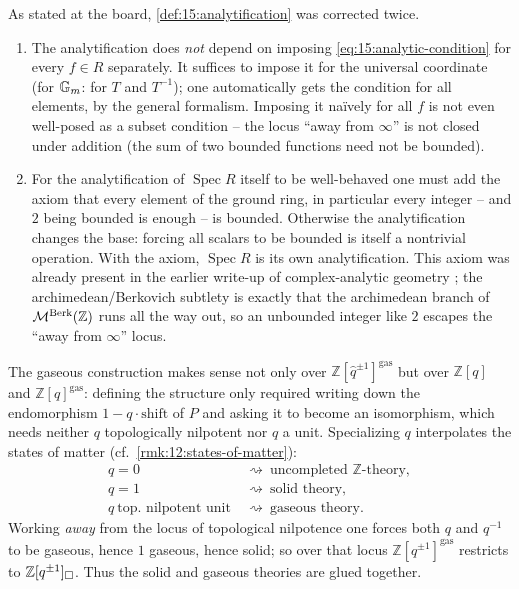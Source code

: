 \begin{remark}
\label{rmk:15:analytic-corrections}
As stated at the board, \cref{def:15:analytification} was corrected twice.
\begin{enumerate}
\item The analytification does \emph{not} depend on imposing
\eqref{eq:15:analytic-condition} for every $f\in R$ separately. It suffices to impose
it for the universal coordinate (for $\mathbb{G}_{m}$: for $T$ and $T^{-1}$); one automatically
gets the condition for all elements, by the general formalism. Imposing it na\"ively
for all $f$ is not even well-posed as a subset condition -- the locus ``away from
$\infty$'' is not closed under addition (the sum of two bounded functions need not be
bounded).
\item For the analytification of $\operatorname{Spec} R$ itself to be well-behaved one
must add the axiom that every element of the ground ring, in particular every integer
-- and $2$ being bounded is enough -- is bounded. Otherwise the analytification
changes the base: forcing all scalars to be bounded is itself a nontrivial operation.
With the axiom, $\operatorname{Spec} R$ is its own analytification. This axiom was
already present in the earlier write-up of complex-analytic geometry
\cite{scholze2020analytic}; the archimedean/Berkovich subtlety is exactly that the
archimedean branch of $\mathcal{M}^{\mathrm{Berk}}(\mathbb{Z})$ runs all the way out, so an unbounded
integer like $2$ escapes the ``away from $\infty$'' locus.
\end{enumerate}
\end{remark}

\begin{remark}
\label{rmk:15:glue}
The gaseous construction makes sense not only over
$\mathbb{Z}[\widehat q^{\pm1}]^{\mathrm{gas}}$ but over
$\mathbb{Z}[q]$ and $\mathbb{Z}[q]^{\mathrm{gas}}$: defining the structure only required
writing down the endomorphism $1 - q\cdot\mathrm{shift}$ of $P$ and asking it to
become an isomorphism, which needs neither $q$ topologically nilpotent nor $q$ a unit.
Specializing $q$ interpolates the states of matter (cf.\ \cref{rmk:12:states-of-matter}):
\begin{equation*}
\begin{aligned}
q = 0&\ \rightsquigarrow\ \text{uncompleted } \mathbb{Z}\text{-theory},\\
q = 1&\ \rightsquigarrow\ \text{solid theory},\\
q\ \text{top.\ nilpotent unit}&\ \rightsquigarrow\ \text{gaseous theory}.
\end{aligned}
\end{equation*}
Working \emph{away} from the locus of topological nilpotence one forces both $q$ and
$q^{-1}$ to be gaseous, hence $1$ gaseous, hence solid; so over that locus
$\mathbb{Z}[q^{\pm1}]^{\mathrm{gas}}$ restricts to $\mathbb{Z}[q^{\pm1}]_{\square}$.
Thus the solid and gaseous theories are glued together.
\end{remark}

